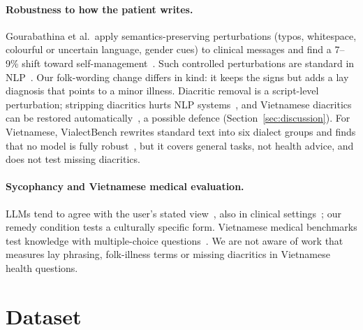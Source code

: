 \documentclass[runningheads]{llncs}
\begin{document}
\paragraph{Robustness to how the patient writes.} Gourabathina et al.\ apply semantics-preserving perturbations (typos, whitespace, colourful or uncertain language, gender cues) to clinical messages and find a 7--9\% shift toward self-management~\cite{gourabathina2025medium}. Such controlled perturbations are standard in NLP~\cite{ribeiro2020checklist,belinkov2018synthetic}. Our folk-wording change differs in kind: it keeps the signs but adds a lay diagnosis that points to a minor illness. Diacritic removal is a script-level perturbation; stripping diacritics hurts NLP systems~\cite{gorman2024diacritics}, and Vietnamese diacritics can be restored automatically~\cite{naplava2018diacritics}, a possible defence (Section~\ref{sec:discussion}). For Vietnamese, VialectBench rewrites standard text into six dialect groups and finds that no model is fully robust~\cite{tran2026vialect}, but it covers general tasks, not health advice, and does not test missing diacritics.

\paragraph{Sycophancy and Vietnamese medical evaluation.} LLMs tend to agree with the user's stated view~\cite{sharma2024sycophancy}, also in clinical settings~\cite{overalignment2026}; our remedy condition tests a culturally specific form. Vietnamese medical benchmarks test knowledge with multiple-choice questions~\cite{vm14k}. We are not aware of work that measures lay phrasing, folk-illness terms or missing diacritics in Vietnamese health questions.

\section{Dataset}
\end{document}
